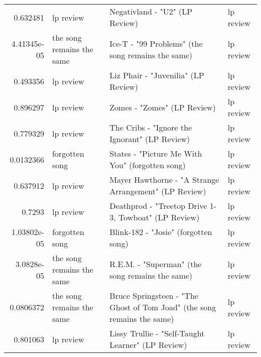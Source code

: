 \documentclass[letterpaper,10pt]{article}
\begin{document}
\begin{table}[H]
\begin{adjustbox}{max width=\linewidth}
\begin{tabular}{rlll}
  0.632481    & lp review                 & Negativland - "U2" (LP Review)                                                                               & lp review                 \\
  4.41345e-05 & the song remains the same & Ice-T - "99 Problems" (the song remains the same)                                                            & lp review                 \\
  0.493356    & lp review                 & Liz Phair - "Juvenilia" (LP Review)                                                                          & lp review                 \\
  0.896297    & lp review                 & Zomes - "Zomes" (LP Review)                                                                                  & lp review                 \\
  0.779329    & lp review                 & The Cribs - "Ignore the Ignorant" (LP Review)                                                                & lp review                 \\
  0.0132366   & forgotten song            & States - "Picture Me With You" (forgotten song)                                                              & lp review                 \\
  0.637912    & lp review                 & Mayer Hawthorne - "A Strange Arrangement" (LP Review)                                                        & lp review                 \\
  0.7293      & lp review                 & Deathprod - "Treetop Drive 1-3, Towboat" (LP Review)                                                         & lp review                 \\
  1.03802e-05 & forgotten song            & Blink-182 - "Josie" (forgotten song)                                                                         & lp review                 \\
  3.0828e-05  & the song remains the same & R.E.M. - "Superman" (the song remains the same)                                                              & lp review                 \\
  0.0806372   & the song remains the same & Bruce Springsteen - "The Ghost of Tom Joad" (the song remains the same)                                      & lp review                 \\
  0.801063    & lp review                 & Lissy Trullie - "Self-Taught Learner" (LP Review)                                                            & lp review                 \\

\end{tabular}
\end{adjustbox}
\end{table}
\end{document}
